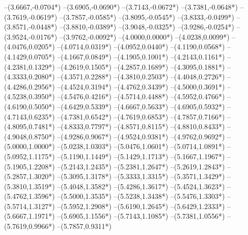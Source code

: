 {	--(3.6667,{-0.0704*\yskala})
	--(3.6905,{-0.0690*\yskala})
	--(3.7143,{-0.0672*\yskala})
	--(3.7381,{-0.0648*\yskala})
	--(3.7619,{-0.0619*\yskala})
	--(3.7857,{-0.0585*\yskala})
	--(3.8095,{-0.0545*\yskala})
	--(3.8333,{-0.0499*\yskala})
	--(3.8571,{-0.0448*\yskala})
	--(3.8810,{-0.0389*\yskala})
	--(3.9048,{-0.0325*\yskala})
	--(3.9286,{-0.0254*\yskala})
	--(3.9524,{-0.0176*\yskala})
	--(3.9762,{-0.0092*\yskala})
	--(4.0000,{0.0000*\yskala})
	--(4.0238,{0.0099*\yskala})
	--(4.0476,{0.0205*\yskala})
	--(4.0714,{0.0319*\yskala})
	--(4.0952,{0.0440*\yskala})
	--(4.1190,{0.0568*\yskala})
	--(4.1429,{0.0705*\yskala})
	--(4.1667,{0.0849*\yskala})
	--(4.1905,{0.1001*\yskala})
	--(4.2143,{0.1161*\yskala})
	--(4.2381,{0.1329*\yskala})
	--(4.2619,{0.1505*\yskala})
	--(4.2857,{0.1689*\yskala})
	--(4.3095,{0.1881*\yskala})
	--(4.3333,{0.2080*\yskala})
	--(4.3571,{0.2288*\yskala})
	--(4.3810,{0.2503*\yskala})
	--(4.4048,{0.2726*\yskala})
	--(4.4286,{0.2956*\yskala})
	--(4.4524,{0.3194*\yskala})
	--(4.4762,{0.3439*\yskala})
	--(4.5000,{0.3691*\yskala})
	--(4.5238,{0.3950*\yskala})
	--(4.5476,{0.4216*\yskala})
	--(4.5714,{0.4488*\yskala})
	--(4.5952,{0.4766*\yskala})
	--(4.6190,{0.5050*\yskala})
	--(4.6429,{0.5339*\yskala})
	--(4.6667,{0.5633*\yskala})
	--(4.6905,{0.5932*\yskala})
	--(4.7143,{0.6235*\yskala})
	--(4.7381,{0.6542*\yskala})
	--(4.7619,{0.6853*\yskala})
	--(4.7857,{0.7166*\yskala})
	--(4.8095,{0.7481*\yskala})
	--(4.8333,{0.7797*\yskala})
	--(4.8571,{0.8115*\yskala})
	--(4.8810,{0.8433*\yskala})
	--(4.9048,{0.8750*\yskala})
	--(4.9286,{0.9067*\yskala})
	--(4.9524,{0.9381*\yskala})
	--(4.9762,{0.9692*\yskala})
	--(5.0000,{1.0000*\yskala})
	--(5.0238,{1.0303*\yskala})
	--(5.0476,{1.0601*\yskala})
	--(5.0714,{1.0891*\yskala})
	--(5.0952,{1.1175*\yskala})
	--(5.1190,{1.1449*\yskala})
	--(5.1429,{1.1713*\yskala})
	--(5.1667,{1.1967*\yskala})
	--(5.1905,{1.2208*\yskala})
	--(5.2143,{1.2435*\yskala})
	--(5.2381,{1.2647*\yskala})
	--(5.2619,{1.2843*\yskala})
	--(5.2857,{1.3020*\yskala})
	--(5.3095,{1.3178*\yskala})
	--(5.3333,{1.3315*\yskala})
	--(5.3571,{1.3429*\yskala})
	--(5.3810,{1.3519*\yskala})
	--(5.4048,{1.3582*\yskala})
	--(5.4286,{1.3617*\yskala})
	--(5.4524,{1.3623*\yskala})
	--(5.4762,{1.3596*\yskala})
	--(5.5000,{1.3535*\yskala})
	--(5.5238,{1.3438*\yskala})
	--(5.5476,{1.3303*\yskala})
	--(5.5714,{1.3127*\yskala})
	--(5.5952,{1.2908*\yskala})
	--(5.6190,{1.2645*\yskala})
	--(5.6429,{1.2333*\yskala})
	--(5.6667,{1.1971*\yskala})
	--(5.6905,{1.1556*\yskala})
	--(5.7143,{1.1085*\yskala})
	--(5.7381,{1.0556*\yskala})
	--(5.7619,{0.9966*\yskala})
	--(5.7857,{0.9311*\yskala})
}
